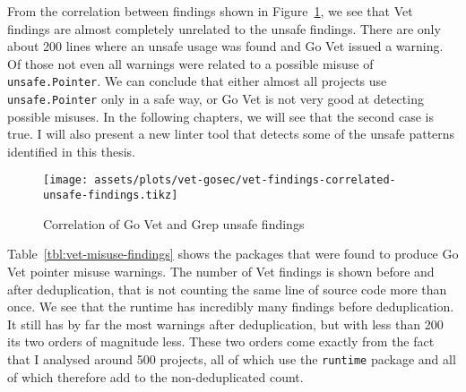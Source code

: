 From the correlation between findings shown in Figure~\ref{fig:correlation-vet-grep-findings}, we see that Vet findings
are almost completely unrelated to the unsafe findings.
There are only about 200 lines where an unsafe usage was found and Go Vet issued a warning.
Of those not even all warnings were related to a possible misuse of \texttt{unsafe.Pointer}.
We can conclude that either almost all projects use \texttt{unsafe.Pointer} only in a safe way, or Go Vet is not very
good at detecting possible misuses.
In the following chapters, we will see that the second case is true.
I will also present a new linter tool that detects some of the unsafe patterns identified in this thesis.

\begin{figure}[ht]
    \centering
    {\scriptsize \texttt{[image: assets/plots/vet-gosec/vet-findings-correlated-unsafe-findings.tikz]}}
    \caption{Correlation of Go Vet and Grep unsafe findings}
    \label{fig:correlation-vet-grep-findings}
\end{figure}

Table~\ref{tbl:vet-misuse-findings} shows the packages that were found to produce Go Vet pointer misuse warnings.
The number of Vet findings is shown before and after deduplication, that is not counting the same line of source code
more than once.
We see that the runtime has incredibly many findings before deduplication.
It still has by far the most warnings after deduplication, but with less than 200 its two orders of magnitude less.
These two orders come exactly from the fact that I analysed around 500 projects, all of which use the \texttt{runtime}
package and all of which therefore add to the non-deduplicated count.

